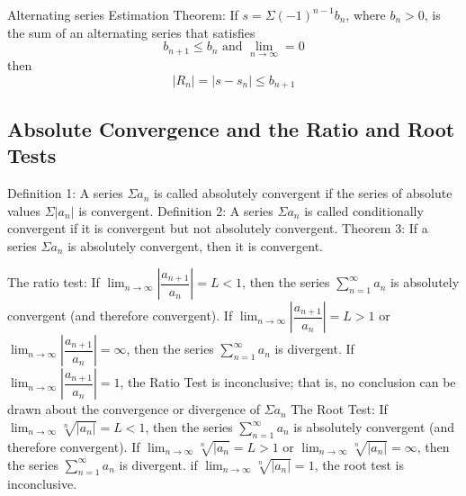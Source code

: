 \documentclass{article}
\begin{document}
        \begin{outline}
        \1 Alternating series Estimation Theorem: If \(s=\Sigma (-1)^{n-1}b_n\), where \(b_n>0\), is the sum of an alternating series that satisfies \[b_{n+1}\leq b_n\mbox{ and }\lim_{n\to\infty}=0\] then \[|R_n|=|s-s_n|\leq b_{n+1}\]
    \end{outline}
    \subsection{Absolute Convergence and the Ratio and Root Tests}
    \begin{outline}
        \1 Definition 1: A series \(\Sigma a_n\) is called absolutely convergent if the series of absolute values \(\Sigma|a_n|\) is convergent. 
        \1 Definition 2: A series \(\Sigma a_n\) is called conditionally convergent if it is convergent but not absolutely convergent. 
        \1 Theorem 3: If a series \(\Sigma a_n\) is absolutely convergent, then it is convergent. 
    \end{outline}

\begin{outline}
    
        \1 The ratio test: 
            \2 If \(\lim_{n\to\infty}\left|\dfrac{a_{n+1}}{a_n}\right|=L<1\), then the series \(\sum^\infty_{n=1}a_n\) is absolutely convergent (and therefore convergent). 
            \2 If \(\lim_{n\to\infty}\left|\dfrac{a_{n+1}}{a_n}\right|=L>1\) or \(\lim_{n\to\infty}\left|\dfrac{a_{n+1}}{a_n}\right|=\infty\), then the series \(\sum^\infty_{n=1}a_n\) is divergent. 
            \2 If \(\lim_{n\to\infty}\left|\dfrac{a_{n+1}}{a_n}\right|=1\), the Ratio Test is inconclusive; that is, no conclusion can be drawn about the convergence or divergence of \(\Sigma a_n\)
        \1 The Root Test: 
            \2 If \(\lim_{n\to\infty}\sqrt[n]{|a_n|}=L<1\), then the series \(\sum^\infty_{n=1}a_n\) is absolutely convergent (and therefore convergent). 
            \2 If \(\lim_{n\to\infty}\sqrt[n]{|a_n}=L>1\) or \(\lim_{n\to\infty}\sqrt[n]{|a_n|}=\infty\), then the series \(\sum^\infty_{n=1}a_n\) is divergent. 
            \2 if \(\lim_{n\to\infty}\sqrt[n]{|a_n|}=1\), the root test is inconclusive. 
    
        \end{outline}
        
\end{document}
